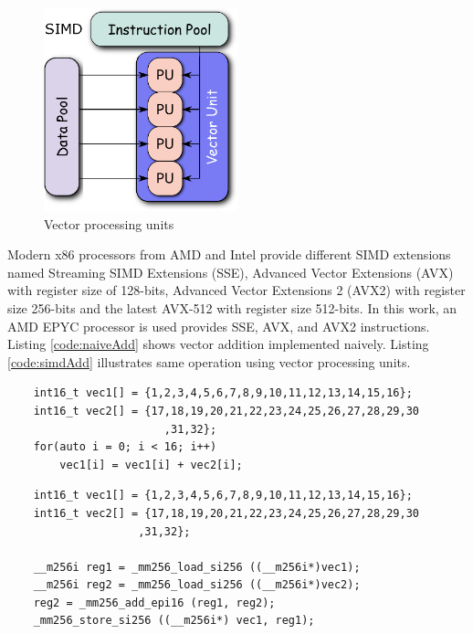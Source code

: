 \begin{figure}[h]
	\centering
	\includegraphics[width=0.5\textwidth]{./figures/SIMD2.eps}
	\caption{Vector processing units \cite{SIMDWiki}}
	\label{fig:simdUnits}
\end{figure}

Modern x86 processors from AMD and Intel provide different SIMD extensions named Streaming SIMD Extensions (SSE), Advanced Vector Extensions (AVX) with register size of 128-bits, Advanced Vector Extensions 2 (AVX2) with register size 256-bits and the latest AVX-512 with register size 512-bits. In this work, an AMD EPYC processor is used provides SSE, AVX, and AVX2 instructions. Listing \ref{code:naiveAdd} shows vector addition implemented naively. Listing \ref{code:simdAdd} illustrates same operation using vector processing units. 

\begin{code}
	\label{code:naiveAdd}
	\begin{verbatim}
	int16_t vec1[] = {1,2,3,4,5,6,7,8,9,10,11,12,13,14,15,16};
	int16_t vec2[] = {17,18,19,20,21,22,23,24,25,26,27,28,29,30
						,31,32};
	for(auto i = 0; i < 16; i++)
		vec1[i] = vec1[i] + vec2[i];
	\end{verbatim}
\end{code}

\begin{code}
	\label{code:simdAdd}
	\begin{verbatim}
	int16_t vec1[] = {1,2,3,4,5,6,7,8,9,10,11,12,13,14,15,16};
	int16_t vec2[] = {17,18,19,20,21,22,23,24,25,26,27,28,29,30
					,31,32};
	
	__m256i reg1 = _mm256_load_si256 ((__m256i*)vec1);
	__m256i reg2 = _mm256_load_si256 ((__m256i*)vec2);
	reg2 = _mm256_add_epi16 (reg1, reg2);
	_mm256_store_si256 ((__m256i*) vec1, reg1);
	
	\end{verbatim}
\end{code}

